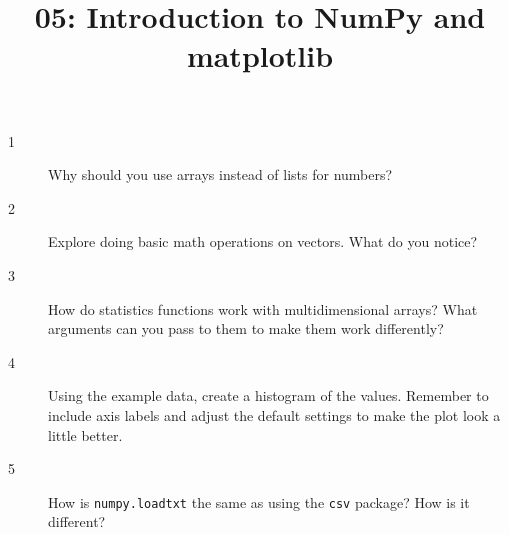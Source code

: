 \documentclass[10pt]{amsart}
\title{05: Introduction to NumPy and matplotlib}
\begin{document}
\maketitle

\begin{description}
\item[1] Why should you use arrays instead of lists for numbers?
\vspace{0.75in}

\item[2] Explore doing basic math operations on vectors. What do you notice?
\vspace{0.75in}

\item[3] How do statistics functions work with multidimensional arrays? What
arguments can you pass to them to make them work differently?
\vspace{0.75in}

\item[4] Using the example data, create a histogram of the values. Remember to
include axis labels and adjust the default settings to make the plot look a
little better.
\vspace{0.75in}

\item[5] How is \verb+numpy.loadtxt+ the same as using the \verb+csv+ package?
How is it different?
\vspace{0.75in}
\end{description}
\end{document}
